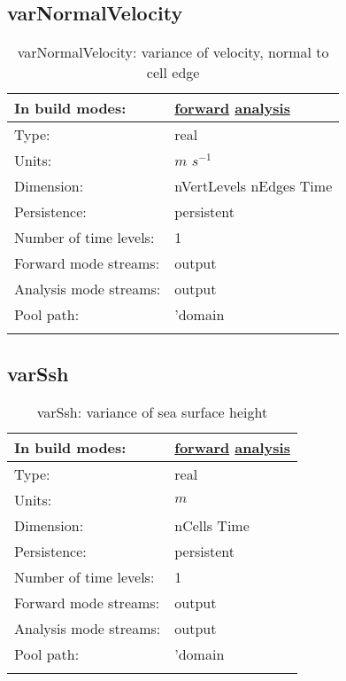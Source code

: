 \subsection[varNormalVelocity]{varNormalVelocity}
\label{subsec:var_sec_average_varNormalVelocity}
\begin{center}
\begin{longtable}{| p{2.0in} | p{4.0in} |}
        \hline 
        In build modes: & \hyperref[subsec:forward_var_tab_average]{forward} \hyperref[subsec:analysis_var_tab_average]{analysis} \\
        \hline 
        Type: & real \\
        \hline 
        Units: & $m$ $s^{-1}$ \\
        \hline 
        Dimension: & nVertLevels nEdges Time \\
        \hline 
        Persistence: & persistent \\
        \hline 
        Number of time levels: & 1 \\
        \hline 
		 Forward mode streams: &  output \\
        \hline 
		 Analysis mode streams: &  output \\
        \hline 
            Pool path: & 'domain %
 \\
		 \hline 
    \caption{varNormalVelocity: variance of velocity, normal to cell edge}
\end{longtable}
\end{center}
\subsection[varSsh]{varSsh}
\label{subsec:var_sec_average_varSsh}
\begin{center}
\begin{longtable}{| p{2.0in} | p{4.0in} |}
        \hline 
        In build modes: & \hyperref[subsec:forward_var_tab_average]{forward} \hyperref[subsec:analysis_var_tab_average]{analysis} \\
        \hline 
        Type: & real \\
        \hline 
        Units: & $m$ \\
        \hline 
        Dimension: & nCells Time \\
        \hline 
        Persistence: & persistent \\
        \hline 
        Number of time levels: & 1 \\
        \hline 
		 Forward mode streams: &  output \\
        \hline 
		 Analysis mode streams: &  output \\
        \hline 
            Pool path: & 'domain %
 \\
		 \hline 
    \caption{varSsh: variance of sea surface height}
\end{longtable}
\end{center}
